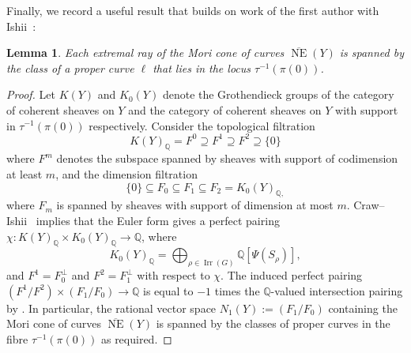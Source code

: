 \documentclass[11pt,reqno]{amsart}
\numberwithin{equation}{section}
\newtheorem{lemma}[theorem]{Lemma}
\newtheorem{corollary}[theorem]{Corollary}
\theoremstyle{definition}
\newcommand{\QQ}{\ensuremath{\mathbb{Q}}}
\newcommand{\Dnil}{D_{\operatorname{nil}}}
\newcommand{\0}{\operatorname{0}}
\newcommand{\Irr}{\operatorname{Irr}}
\begin{document}
 

 Finally, we record a useful result that builds on work of the first author with Ishii~\cite{CI04}:

 \begin{lemma}
     \label{lem:curveintauinverse0}
 Each extremal ray of the Mori cone of curves $\overline{\operatorname{NE}}(Y)$ is spanned by the class of a proper curve $\ell$ that lies in the locus $\tau^{-1}(\pi(0))$.    
     \end{lemma}
     \begin{proof}
 Let $K(Y)$ and $K_0(Y)$ denote the Grothendieck groups of the category of coherent sheaves on $Y$ and the category of coherent sheaves on $Y$ with support in $\tau^{-1}(\pi(0))$ respectively. Consider the topological filtration 
 \[
K(Y)_{\mathbb{Q}}=F^0\supseteq F^1\supseteq F^2\supseteq \{0\}
  \]
 where $F^m$ denotes the subspace spanned by sheaves with support of codimension at least $m$, and the dimension filtration
  \[
 \{0\}\subseteq F_0\subseteq F_1 \subseteq F_2 = K_0(Y)_{\mathbb{Q},
 }\]
  where $F_m$ is spanned by sheaves with support of dimension at most $m$. Craw--Ishii~\cite[Proposition~5.1]{CI04} implies that the Euler form gives a perfect pairing $\chi\colon K(Y)_{\QQ}\times K_{0}(Y)_{\QQ}\to \QQ$, where 
 \[
 K_0(Y)_{\QQ} = \bigoplus_{\rho\in \Irr(G)} \QQ [\Psi(S_\rho)],
 \]
 and $F^1=F_0^\perp$ and $F^2=F_1^\perp$ with respect to $\chi$. The induced perfect pairing $(F^1/F^2)\times (F_1/F_0)\rightarrow \QQ$  is equal to $-1$ times the $\QQ$-valued intersection pairing by \cite[Proposition~2.3(ii), Corollary~2.5]{C21}. In particular, the rational vector space $N_1(Y):=(F_1/F_0)$ containing the Mori cone of curves $\overline{\operatorname{NE}}(Y)$ is spanned by the classes of proper curves in the fibre $\tau^{-1}(\pi(0))$ as required.  
     \end{proof}
\end{document}
